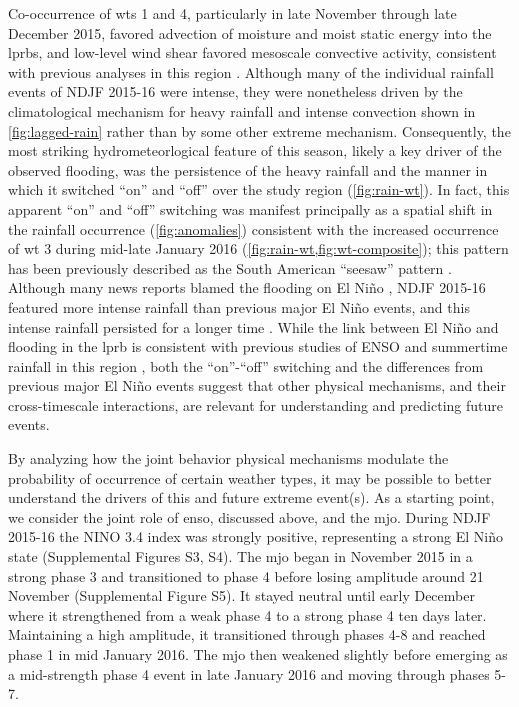 \documentclass[twocol]{ametsoc}
\begin{document}
Co-occurrence of \glspl{wt} 1 and 4, particularly in late November through late December 2015, favored advection of moisture and moist static energy into the \glspl{lprb}, and low-level wind shear favored mesoscale convective activity, consistent with previous analyses in this region \citep{Velasco1987,Marengo2004,Saulo2007,Salio2007}.
Although many of the individual rainfall events of NDJF 2015-16 were intense, they were nonetheless driven by the climatological mechanism for heavy rainfall and intense convection shown in \cref{fig:lagged-rain} rather than by some other extreme mechanism.
Consequently, the most striking hydrometeorlogical feature of this season, likely a key driver of the observed flooding, was the persistence of the heavy rainfall and the manner in which it switched ``on'' and ``off'' over the study region (\cref{fig:rain-wt}).
In fact, this apparent ``on'' and ``off'' switching was manifest principally as a spatial shift in the rainfall occurrence (\cref{fig:anomalies}) consistent with the increased occurrence of \gls{wt} 3 during mid-late January 2016 (\cref{fig:rain-wt,fig:wt-composite}); this pattern has been previously described as the South American ``seesaw'' pattern \citep{Nogues-Paegle1997}.
Although many news reports blamed the flooding on El Ni\~{n}o \citep{BBC2015}, NDJF 2015-16 featured more intense rainfall than previous major El Ni\~no events, and this intense rainfall persisted for a longer time .
While the link between El Ni\~{n}o and flooding in the \gls{lprb} is consistent with previous studies of ENSO and summertime rainfall in this region \citep{Velasco1987,Grimm2000,Salio2002,Grimm2003,Carvalho2004,Grimm2009a,Bravo2011}, both the ``on''-``off'' switching and the differences from previous major El Ni\~{n}o events suggest that other physical mechanisms, and their cross-timescale interactions, are relevant for understanding and predicting future events.

By analyzing how the joint behavior physical mechanisms modulate the probability of occurrence of certain weather types, it may be possible to better understand the drivers of this and future extreme event(s).
As a starting point, we consider the joint role of \gls{enso}, discussed above, and the \gls{mjo}.
During NDJF 2015-16 the NINO 3.4 index was strongly positive, representing a strong El Ni\~{n}o state (Supplemental Figures S3, S4).
The \gls{mjo} began in November 2015 in a strong phase 3 and transitioned to phase 4 before losing amplitude around 21 November (Supplemental Figure S5).
It stayed neutral until early December where it strengthened from a weak phase 4 to a strong phase 4 ten days later.
Maintaining a high amplitude, it transitioned through phases 4-8 and reached phase 1 in mid January 2016.
The \gls{mjo} then weakened slightly before emerging as a mid-strength phase 4 event in late January 2016 and moving through phases 5-7.
\end{document}

